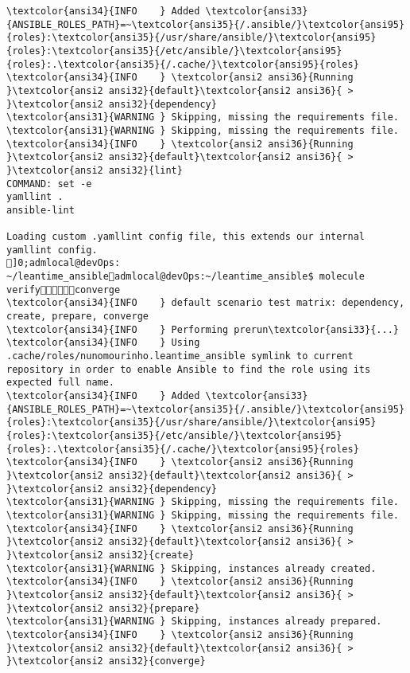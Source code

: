 \documentclass{scrartcl}
\begin{document}
\begin{Verbatim}
\textcolor{ansi34}{INFO    } Added \textcolor{ansi33}{ANSIBLE_ROLES_PATH}=~\textcolor{ansi35}{/.ansible/}\textcolor{ansi95}{roles}:\textcolor{ansi35}{/usr/share/ansible/}\textcolor{ansi95}{roles}:\textcolor{ansi35}{/etc/ansible/}\textcolor{ansi95}{roles}:.\textcolor{ansi35}{/.cache/}\textcolor{ansi95}{roles}
\textcolor{ansi34}{INFO    } \textcolor{ansi2 ansi36}{Running }\textcolor{ansi2 ansi32}{default}\textcolor{ansi2 ansi36}{ > }\textcolor{ansi2 ansi32}{dependency}
\textcolor{ansi31}{WARNING } Skipping, missing the requirements file.
\textcolor{ansi31}{WARNING } Skipping, missing the requirements file.
\textcolor{ansi34}{INFO    } \textcolor{ansi2 ansi36}{Running }\textcolor{ansi2 ansi32}{default}\textcolor{ansi2 ansi36}{ > }\textcolor{ansi2 ansi32}{lint}
COMMAND: set -e
yamllint .
ansible-lint

Loading custom .yamllint config file, this extends our internal yamllint config.
]0;admlocal@devOps: ~/leantime_ansibleadmlocal@devOps:~/leantime_ansible$ molecule verifyconverge
\textcolor{ansi34}{INFO    } default scenario test matrix: dependency, create, prepare, converge
\textcolor{ansi34}{INFO    } Performing prerun\textcolor{ansi33}{...}
\textcolor{ansi34}{INFO    } Using .cache/roles/nunomourinho.leantime_ansible symlink to current repository in order to enable Ansible to find the role using its expected full name.
\textcolor{ansi34}{INFO    } Added \textcolor{ansi33}{ANSIBLE_ROLES_PATH}=~\textcolor{ansi35}{/.ansible/}\textcolor{ansi95}{roles}:\textcolor{ansi35}{/usr/share/ansible/}\textcolor{ansi95}{roles}:\textcolor{ansi35}{/etc/ansible/}\textcolor{ansi95}{roles}:.\textcolor{ansi35}{/.cache/}\textcolor{ansi95}{roles}
\textcolor{ansi34}{INFO    } \textcolor{ansi2 ansi36}{Running }\textcolor{ansi2 ansi32}{default}\textcolor{ansi2 ansi36}{ > }\textcolor{ansi2 ansi32}{dependency}
\textcolor{ansi31}{WARNING } Skipping, missing the requirements file.
\textcolor{ansi31}{WARNING } Skipping, missing the requirements file.
\textcolor{ansi34}{INFO    } \textcolor{ansi2 ansi36}{Running }\textcolor{ansi2 ansi32}{default}\textcolor{ansi2 ansi36}{ > }\textcolor{ansi2 ansi32}{create}
\textcolor{ansi31}{WARNING } Skipping, instances already created.
\textcolor{ansi34}{INFO    } \textcolor{ansi2 ansi36}{Running }\textcolor{ansi2 ansi32}{default}\textcolor{ansi2 ansi36}{ > }\textcolor{ansi2 ansi32}{prepare}
\textcolor{ansi31}{WARNING } Skipping, instances already prepared.
\textcolor{ansi34}{INFO    } \textcolor{ansi2 ansi36}{Running }\textcolor{ansi2 ansi32}{default}\textcolor{ansi2 ansi36}{ > }\textcolor{ansi2 ansi32}{converge}


\end{Verbatim}
\end{document}
